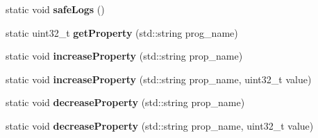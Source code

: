 \begin{DoxyCompactItemize}
\item 
\hypertarget{classLogging_a5644203460a5f5098c2b4bb80bb381ee}{static void {\bfseries safe\-Logs} ()}\label{classLogging_a5644203460a5f5098c2b4bb80bb381ee}

\item 
\hypertarget{classLogging_a123636cea9ed17bdc7afa8796c22a12e}{static uint32\-\_\-t {\bfseries get\-Property} (std\-::string prog\-\_\-name)}\label{classLogging_a123636cea9ed17bdc7afa8796c22a12e}

\item 
\hypertarget{classLogging_a42d34adb4b6a22bc96db3504860bde82}{static void {\bfseries increase\-Property} (std\-::string prop\-\_\-name)}\label{classLogging_a42d34adb4b6a22bc96db3504860bde82}

\item 
\hypertarget{classLogging_ae07d9f8a14eed291f5dfbc75b3f01e0d}{static void {\bfseries increase\-Property} (std\-::string prop\-\_\-name, uint32\-\_\-t value)}\label{classLogging_ae07d9f8a14eed291f5dfbc75b3f01e0d}

\item 
\hypertarget{classLogging_a2c225575cf2bd749524562ac8973aba6}{static void {\bfseries decrease\-Property} (std\-::string prop\-\_\-name)}\label{classLogging_a2c225575cf2bd749524562ac8973aba6}

\item 
\hypertarget{classLogging_a40554f45040eebb3c97cd559edee083b}{static void {\bfseries decrease\-Property} (std\-::string prop\-\_\-name, uint32\-\_\-t value)}\label{classLogging_a40554f45040eebb3c97cd559edee083b}

\end{DoxyCompactItemize}
